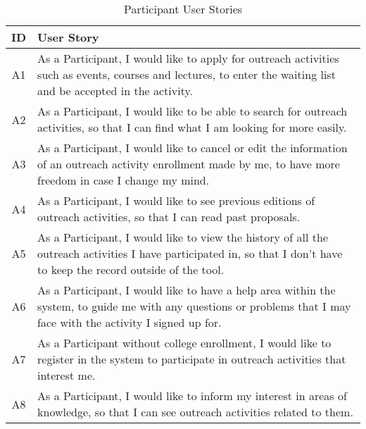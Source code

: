 \begin{table}[!htb]
  \centering
  \setlength{\aboverulesep}{0pt}
  \setlength{\belowrulesep}{0pt}
  \caption{Participant User Stories}
  \label{tab:participant-user-stories}
  \footnotesize
  \begin{tabularx}{\textwidth}{c|X}
    \toprule
    \rowcolor[rgb]{0.753,0.753,0.753} \textbf{ID} & \textbf{User Story}                    \\
    \hline
    \rowcolor[rgb]{0.898,0.898,0.898} A1          & As a Participant, I would like to apply for outreach activities such as events, courses and lectures, to enter the waiting list and be accepted in the activity.                                          \\
    A2                                            & As a Participant, I would like to be able to search for outreach activities, so that I can find what I am looking for more easily.                                     \\
    \rowcolor[rgb]{0.898,0.898,0.898} A3          & As a Participant, I would like to cancel or edit the information of an outreach activity enrollment made by me, to have more freedom in case I change my mind.                                \\
    A4                                            & As a Participant, I would like to see previous editions of outreach activities, so that I can read past proposals.                              \\
    \rowcolor[rgb]{0.898,0.898,0.898} A5          & As a Participant, I would like to view the history of all the outreach activities I have participated in, so that I don't have to keep the record outside of the tool.                                \\
    A6                                            & As a Participant, I would like to have a help area within the system, to guide me with any questions or problems that I may face with the activity I signed up for.                              \\
    \rowcolor[rgb]{0.898,0.898,0.898} A7          & As a Participant without college enrollment, I would like to register in the system to participate in outreach activities that interest me.                                \\
    A8                                            & As a Participant, I would like to inform my interest in areas of knowledge, so that I can see outreach activities related to them.                              \\

\end{tabularx}
\end{table}
